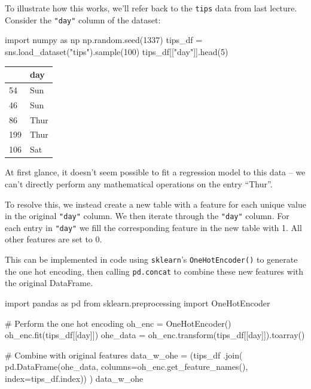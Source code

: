 \documentclass[
  letterpaper,
  DIV=11,
  numbers=noendperiod]{scrreprt}
\newenvironment{Shaded}{\begin{snugshade}}{\end{snugshade}}
\newcommand{\CommentTok}[1]{\textcolor[rgb]{0.37,0.37,0.37}{#1}}
\newcommand{\DecValTok}[1]{\textcolor[rgb]{0.68,0.00,0.00}{#1}}
\newcommand{\ImportTok}[1]{\textcolor[rgb]{0.00,0.46,0.62}{#1}}
\newcommand{\NormalTok}[1]{\textcolor[rgb]{0.00,0.23,0.31}{#1}}
\newcommand{\OperatorTok}[1]{\textcolor[rgb]{0.37,0.37,0.37}{#1}}
\newcommand{\StringTok}[1]{\textcolor[rgb]{0.13,0.47,0.30}{#1}}
\begin{document}
To illustrate how this works, we'll refer back to the \texttt{tips} data
from last lecture. Consider the \texttt{"day"} column of the dataset:

\begin{Shaded}
\begin{Highlighting}[]
\ImportTok{import}\NormalTok{ numpy }\ImportTok{as}\NormalTok{ np}
\NormalTok{np.random.seed(}\DecValTok{1337}\NormalTok{)}
\NormalTok{tips\_df }\OperatorTok{=}\NormalTok{ sns.load\_dataset(}\StringTok{"tips"}\NormalTok{).sample(}\DecValTok{100}\NormalTok{)}
\NormalTok{tips\_df[[}\StringTok{"day"}\NormalTok{]].head(}\DecValTok{5}\NormalTok{)}
\end{Highlighting}
\end{Shaded}

\begin{tabular}{ll}
\toprule
{} &   day \\
\midrule
54  &   Sun \\
46  &   Sun \\
86  &  Thur \\
199 &  Thur \\
106 &   Sat \\
\bottomrule
\end{tabular}

At first glance, it doesn't seem possible to fit a regression model to
this data -- we can't directly perform any mathematical operations on
the entry ``Thur''.

To resolve this, we instead create a new table with a feature for each
unique value in the original \texttt{"day"} column. We then iterate
through the \texttt{"day"} column. For each entry in \texttt{"day"} we
fill the corresponding feature in the new table with 1. All other
features are set to 0.

This can be implemented in code using \texttt{sklearn}'s
\texttt{OneHotEncoder()} to generate the one hot encoding, then calling
\texttt{pd.concat} to combine these new features with the original
DataFrame.

\begin{Shaded}
\begin{Highlighting}[]
\ImportTok{import}\NormalTok{ pandas }\ImportTok{as}\NormalTok{ pd}
\ImportTok{from}\NormalTok{ sklearn.preprocessing }\ImportTok{import}\NormalTok{ OneHotEncoder}

\CommentTok{\# Perform the one hot encoding}
\NormalTok{oh\_enc }\OperatorTok{=}\NormalTok{ OneHotEncoder()}
\NormalTok{oh\_enc.fit(tips\_df[[}\StringTok{\textquotesingle{}day\textquotesingle{}}\NormalTok{]])}
\NormalTok{ohe\_data }\OperatorTok{=}\NormalTok{ oh\_enc.transform(tips\_df[[}\StringTok{\textquotesingle{}day\textquotesingle{}}\NormalTok{]]).toarray()}


\CommentTok{\# Combine with original features}
\NormalTok{data\_w\_ohe }\OperatorTok{=}\NormalTok{ (tips\_df}
\NormalTok{              .join(}
\NormalTok{                  pd.DataFrame(ohe\_data, columns}\OperatorTok{=}\NormalTok{oh\_enc.get\_feature\_names(), index}\OperatorTok{=}\NormalTok{tips\_df.index))}
\NormalTok{             )}
\NormalTok{data\_w\_ohe}
\end{Highlighting}
\end{Shaded}
\end{document}
